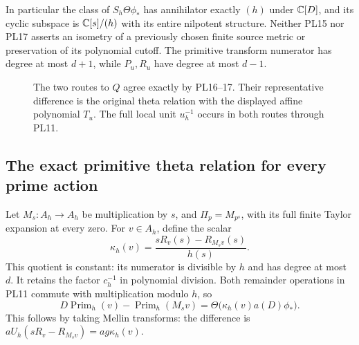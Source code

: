 In particular the class of \(S_h\Theta\phi_*\) has annihilator
exactly \((h)\) under \(\mathbb C[D]\), and its cyclic subspace is
\(\mathbb C[s]/(h)\) with its entire nilpotent structure.
Neither PL15 nor PL17 asserts an isometry of a previously chosen
finite source metric or preservation of its polynomial cutoff.
The primitive transform numerator has degree at most \(d+1\),
while \(P_u,R_u\) have degree at most \(d-1\).

\begin{figure}[ht]\centering
{}
\caption{The two routes to \(Q\) agree exactly by PL16--17.
Their representative difference is the original theta relation with
the displayed affine polynomial \(T_u\). The full local unit
\(u_h^{-1}\) occurs in both routes through PL11.}
\end{figure}

\subsection{The exact primitive theta relation for every prime action}
Let \(M_s:A_h\to A_h\) be multiplication by \(s\), and
\(\Pi_p=M_{p^s}\), with its full finite Taylor expansion at every zero.
For \(v\in A_h\), define the scalar
\[
 \kappa_h(v)=\frac{sR_v(s)-R_{M_sv}(s)}{h(s)}.
 \tag{PL19}\label{pl:pl:kappa}
\]
This quotient is constant: its numerator is divisible by \(h\)
and has degree at most \(d\). It retains the factor \(c_h^{-1}\)
in polynomial division. Both remainder operations in PL11 commute
with multiplication modulo \(h\), so
\[
 D\operatorname{Prim}_h(v)-\operatorname{Prim}_h(M_sv)
          =\Theta\bigl(\kappa_h(v)a(D)\phi_*\bigr).
 \tag{PL20}\label{pl:pl:D-defect}
\]
This follows by taking Mellin transforms: the difference is
\(aU_h(sR_v-R_{M_sv})=a g\kappa_h(v)\).

